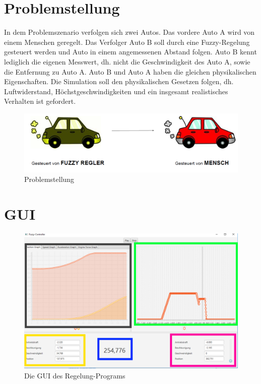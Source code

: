\documentclass[12pt,a4paper,bibliography=totocnumbered,listof=totocnumbered, abstracton]{scrartcl}
\theoremstyle{Umgebung}
\begin{document}
\section{Problemstellung}

In dem Problemszenario verfolgen sich zwei Autos. Das vordere Auto A wird von einem Menschen geregelt. Das Verfolger Auto B soll durch eine Fuzzy-Regelung gesteuert werden und Auto in einem angemessenen Abstand folgen. Auto B kennt lediglich die eigenen Messwert, dh. nicht die Geschwindigkeit des Auto A, sowie die Entfernung zu Auto A.
Auto B und Auto A haben die gleichen physikalischen Eigenschaften. Die Simulation soll den physikalischen Gesetzen folgen, dh. Luftwiderstand, Höchstgeschwindigkeiten und ein insgesamt realistisches Verhalten ist gefordert. 

\begin{figure}
	\centering
	\includegraphics[width=0.9\linewidth]{img/practical/problem}
	\caption{Problemstellung}
	\label{fig:problem}
\end{figure}

\section{GUI}

\begin{figure}
	\centering
	\includegraphics[width=0.9\linewidth]{img/practical/inaction}
	\caption{Die GUI des Regelung-Programs}
	\label{fig:inaction}
\end{figure}
\end{document}
